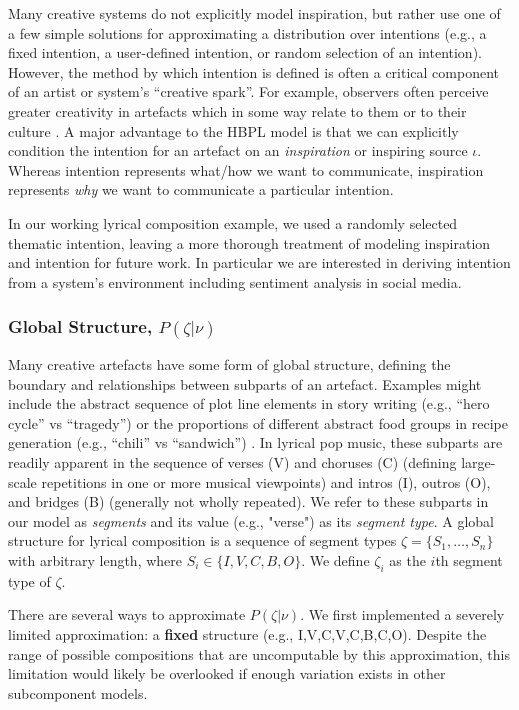 \documentclass[letterpaper]{article}
\begin{document}
Many creative systems do not explicitly model inspiration, but rather use one of a few simple solutions for approximating a distribution over intentions (e.g., a fixed intention, a user-defined intention, or random selection of an intention). However, the method by which intention is defined is often a critical component of an artist or system's ``creative spark''. For example, observers often perceive greater creativity in artefacts which in some way relate to them or to their culture \cite{colton2008creativity}. A major advantage to the HBPL model is that we can explicitly condition the intention for an artefact on an \emph{inspiration} or inspiring source $\iota$. Whereas intention represents what/how we want to communicate, inspiration represents \emph{why} we want to communicate a particular intention. 

In our working lyrical composition example, we used a randomly selected thematic intention, leaving a more thorough treatment of modeling inspiration and intention for future work. In particular we are interested in deriving intention from a system's environment including sentiment analysis in social media.

\subsubsection{Global Structure, $P(\zeta|\nu)$}

Many creative artefacts have some form of global structure, defining the boundary and relationships between subparts of an artefact. Examples might include the abstract sequence of plot line elements in story writing (e.g., ``hero cycle'' vs ``tragedy'') or the proportions of different abstract food groups in recipe generation (e.g., ``chili'' vs ``sandwich'') \cite{morris2012soup}. In lyrical pop music, these subparts are readily apparent in the sequence of verses (V) and choruses (C) (defining large-scale repetitions in one or more musical viewpoints) and intros (I), outros (O), and bridges (B) (generally not wholly repeated). We refer to these subparts in our model as \textit{segments} and its value (e.g., "verse") as its \textit{segment type}. A global structure for lyrical composition is a sequence of segment types $\zeta = \{S_1,\dots,S_n\}$ with arbitrary length, where $S_i\in\{I,V,C,B,O\}$. We define $\zeta_i$ as the $i$th segment type of $\zeta$.

There are several ways to approximate $P(\zeta|\nu)$. We first implemented a severely limited approximation: a \textbf{fixed} structure (e.g., I,V,C,V,C,B,C,O). Despite the range of possible compositions that are uncomputable by this approximation, this limitation would likely be overlooked if enough variation exists in other subcomponent models.
\end{document}
